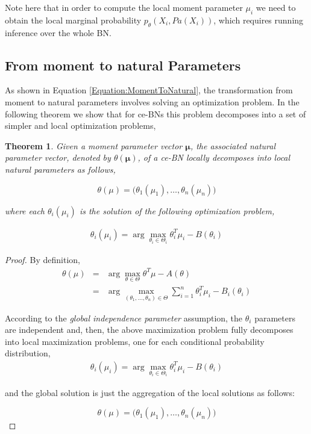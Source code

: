 \documentclass[11pt, oneside]{article}   	%
\newtheorem{theorem}{Theorem}
\newcommand{\bm}{\mathbf}
\numberwithin{figure}{section}
\numberwithin{equation}{section}
\numberwithin{table}{section}
\theoremstyle{definition}
\begin{document}
Note here that in order to compute the local moment parameter $\mu_i$ we need to obtain the local marginal probability $p_\theta (X_i,Pa(X_i))$, which requires running inference over the whole BN.

\subsection{From moment to natural Parameters} \label{Section:CEFBN:MomentToNatural}

As shown in Equation \ref{Equation:MomentToNatural}, the transformation from moment to natural parameters involves solving an optimization problem. In the following theorem we show that for ce-BNs this problem decomposes into a set of simpler and local optimization problems, 

\begin{theorem}
\label{thm:MomentToNatural}
Given a moment parameter vector $\bm \mu$, the associated natural parameter vector, denoted by $\theta(\bm \mu)$, of a ce-BN locally decomposes into local natural parameters as follows,

$$ \theta(\mu) = \big(\theta_1(\mu_1), \ldots, \theta_n(\mu_n)\big)$$

\noindent where each $\theta_i(\mu_i)$ is the solution of the following optimization problem, 

\begin{eqnarray}
\label{Equation:CEFBN_MomentToNaturalLocal}
\theta_i(\mu_i) = \arg\max_{\theta_i\in\Theta_i} \theta_i^T\mu_i - B(\theta_i)
\end{eqnarray}

\end{theorem}
\begin{proof}
By definition, 
\begin{eqnarray*}
\label{Equation:CEFBN_MomentToNatural}
\theta(\mu) &=& \arg\max_{\theta\in\Theta} \theta^T\mu
-A(\theta)\nonumber \\
&=& \arg\max_{(\theta_1,\ldots, \theta_n) \in\Theta} \sum_{i=1}^n \theta_i^T \mu_i - B_i(\theta_i) 
\end{eqnarray*}

According to the \emph{global independence parameter} assumption, the $\theta_i$ parameters are independent and, then, the above maximization problem fully decomposes into local maximization problems, one for each conditional probability distribution,
\begin{eqnarray*}
\label{Equation:CEFBN_MomentToNaturalLocal}
\theta_i(\mu_i) = \arg\max_{\theta_i\in\Theta_i} \theta_i^T\mu_i - B(\theta_i)
\end{eqnarray*}

\noindent and the global solution is just the aggregation of the local solutions as follows: 

$$ \theta(\mu) = \big(\theta_1(\mu_1), \ldots, \theta_n(\mu_n)\big)$$

\end{proof}
\end{document}
